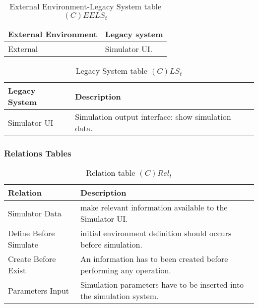 \begin{table}[H]
	\centering
	\begin{tabular}{|p{4cm}|p{8cm}|}
			\hline
			\textbf{External Environment} & \textbf{Legacy system} \\
			\hline
			External & Simulator UI. \\
			\hline
		\end{tabular}
	\caption{External Environment-Legacy System table $(C)EELS_t$}
	\label{tab:ceelst}
\end{table}

\begin{table}[H]
	\centering
	\begin{tabular}{|p{4cm}|p{8cm}|}
			\hline
			\textbf{Legacy System} & \textbf{Description} \\
			\hline
			Simulator UI & Simulation output interface: show simulation data. \\
			\hline
		\end{tabular}
	\caption{Legacy System table $(C)LS_t$}
	\label{tab:clst}
\end{table}

\subsubsection*{Relations Tables}

\begin{table}[H]
	\centering
	\begin{tabular}{|p{4cm}|p{8cm}|}
			\hline
			\textbf{Relation} & \textbf{Description} \\
			\hline
			Simulator Data & make relevant information available to the Simulator UI.
			\\
			\hline
			Define Before Simulate & initial environment definition should occurs
			before simulation. \\
			\hline
			Create Before Exist & An information has to been created before
			performing any operation. \\
			\hline
			Parameters Input & Simulation parameters have to be inserted into the
			simulation system. \\
			\hline
		\end{tabular}
	\caption{Relation table $(C)Rel_t$}
	\label{tab:crelt}
\end{table}

